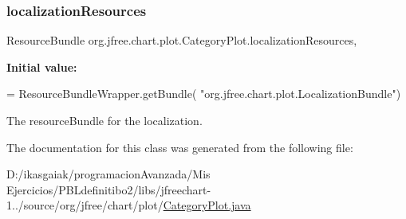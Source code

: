 \subsubsection{\texorpdfstring{localization\+Resources}{localizationResources}}
{\footnotesize\ttfamily Resource\+Bundle org.\+jfree.\+chart.\+plot.\+Category\+Plot.\+localization\+Resources\hspace{0.3cm}{\ttfamily [static]}, {\ttfamily [protected]}}

{\bfseries Initial value\+:}
\begin{DoxyCode}
= ResourceBundleWrapper.getBundle(
            \textcolor{stringliteral}{"org.jfree.chart.plot.LocalizationBundle"})
\end{DoxyCode}
The resource\+Bundle for the localization. 

The documentation for this class was generated from the following file\+:\begin{DoxyCompactItemize}
\item 
D\+:/ikasgaiak/programacion\+Avanzada/\+Mis Ejercicios/\+P\+B\+Ldefinitibo2/libs/jfreechart-\/1../source/org/jfree/chart/plot/\mbox{\hyperlink{_category_plot_8java}{Category\+Plot.\+java}}\end{DoxyCompactItemize}
